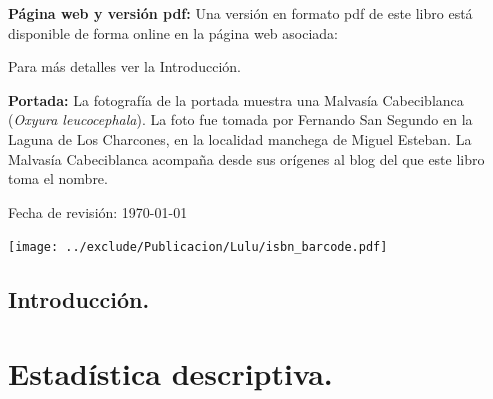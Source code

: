 \documentclass[10pt,a4paper]{book}
\begin{document}
\noindent
{\bf Página web y versión pdf:}
Una versión en formato pdf de este libro está disponible de forma online
en la página web asociada:
\begin{center}
\end{center}
Para más detalles ver la Introducción.


\vfill

\vspace{0.3cm}

\noindent
{\bf Portada:} La fotografía de la portada muestra una Malvasía Cabeciblanca ({\em Oxyura leucocephala}).
La foto fue tomada por Fernando San Segundo en la Laguna de Los Charcones, en la
localidad manchega de Miguel Esteban. La Malvasía Cabeciblanca acompaña desde
sus orígenes al blog del que este libro toma el nombre. \\

\vspace{1cm}

\noindent Fecha de revisión: \today \\

\normalsize

\begin{center}
\texttt{[image: ../exclude/Publicacion/Lulu/isbn\_barcode.pdf]}
\end{center}


\setcounter{tocdepth}{1}
\tableofcontents

\chapter*{Introducción.}



\pagestyle{empty}
\newpage


\mainmatter

\part{Estadística descriptiva.}
\label{parte:EstadisticaDescriptiva}
\end{document}
